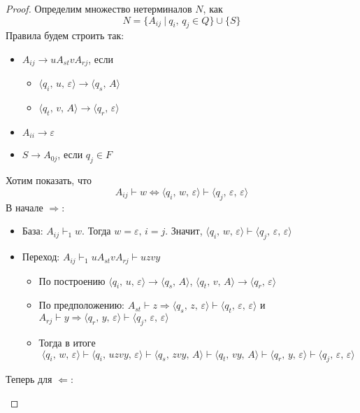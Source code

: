 \documentclass[a4paper,12pt]{article}
\theoremstyle{plain}
\theoremstyle{definition}
\theoremstyle{remark}
\begin{document}
\begin{proof}
	Определим множество нетерминалов $N$, как
	\[
		N = \{A_{ij} \:\vert\: q_i,\, q_j \in Q\} \cup \{S\}
	\]
	Правила будем строить так:
	\begin{itemize}
		\item $A_{ij} \to uA_{st}vA_{rj}$, если
		      \begin{itemize}
			      \item $\langle q_i,\, u,\, \varepsilon\rangle\to\langle q_s,\, A\rangle$
			      \item $\langle q_t,\,v,\,A\rangle\to\langle q_r,\, \varepsilon\rangle$
		      \end{itemize}
		\item $A_{ii} \to \varepsilon$
		\item $S \to A_{0j}$, если $q_j \in F$
	\end{itemize}
	Хотим показать, что
	\[
		A_{ij} \vdash w \Leftrightarrow \langle q_i,\, w,\, \varepsilon\rangle \vdash\langle q_j,\, \varepsilon,\, \varepsilon\rangle
	\]
	В начале $\Rightarrow$:
	\begin{itemize}
		\item База: $A_{ij} \vdash_1 w$. Тогда $w = \varepsilon,\, i = j$. Значит, $\langle q_i,\, w,\, \varepsilon\rangle \vdash \langle q_j,\, \varepsilon,\,\varepsilon\rangle$
		\item Переход: $A_{ij} \vdash_1 uA_{st}vA_{rj} \vdash uzvy$
		      \begin{itemize}
			      \item По построению 			$\langle q_i,\, u,\, \varepsilon\rangle\to\langle q_s,\, A\rangle$, $\langle q_t,\,v,\,A\rangle\to\langle q_r,\, \varepsilon\rangle$
			      \item По предположению: $A_{st} \vdash z \Rightarrow \langle q_s,\, z,\, \varepsilon\rangle \vdash\langle q_t,\, \varepsilon,\, \varepsilon\rangle$ и $A_{rj} \vdash y \Rightarrow \langle q_r,\, y,\, \varepsilon\rangle\vdash\langle q_j,\, \varepsilon,\, \varepsilon\rangle$
			      \item Тогда в итоге
			            \[
				            \langle q_i,\, w,\, \varepsilon\rangle \vdash \langle q_i,\, uzvy,\, \varepsilon\rangle \vdash \langle q_s,\, zvy,\, A\rangle \vdash \langle q_t,\, vy,\, A\rangle \vdash \langle q_r,\, y,\, \varepsilon\rangle \vdash \langle q_j,\, \varepsilon,\, \varepsilon\rangle
			            \]
		      \end{itemize}
	\end{itemize}
	Теперь для $\Leftarrow$:
	\begin{itemize}

\end{itemize}
\end{proof}
\end{document}
